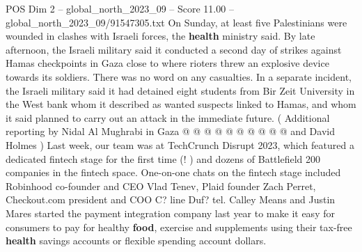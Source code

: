\begin{textsample}{POS Dim 2 – global\_north\_2023\_09 – Score 11.00 – global\_north\_2023\_09/91547305.txt}
On Sunday, at least five Palestinians were wounded in clashes with Israeli forces, the \textbf{health} ministry said.
By late afternoon, the Israeli military said it conducted a second day of strikes against Hamas checkpoints in Gaza close to where rioters threw an explosive device towards its soldiers.
There was no word on any casualties.
In a separate incident, the Israeli military said it had detained eight students from Bir Zeit University in the West bank whom it described as wanted suspects linked to Hamas, and whom it said planned to carry out an attack in the immediate future. ( Additional reporting by Nidal Al Mughrabi in Gaza @ @ @ @ @ @ @ @ @ @ and David Holmes ) Last week, our team was at TechCrunch Disrupt 2023, which featured a dedicated fintech stage for the first time (! ) and dozens of Battlefield 200 companies in the fintech space.
One-on-one chats on the fintech stage included Robinhood co-founder and CEO Vlad Tenev, Plaid founder Zach Perret, Checkout.com president and COO C? line Duf? tel.
Calley Means and Justin Mares started the payment integration company last year to make it easy for consumers to pay for healthy \textbf{food}, exercise and supplements using their tax-free \textbf{health} savings accounts or flexible spending account dollars.

\end{textsample}
